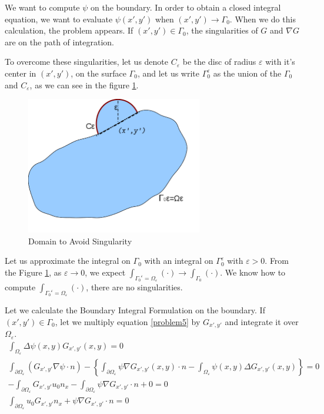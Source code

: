 \documentclass[a4paper,12pt]{article}
\newcommand{\integ}[3]{%
\ensuremath{\displaystyle{\int^{#2}_{#1} #3}}}
\begin{document}
We want to compute $\psi$ on the boundary. In order to obtain a closed integral equation, we want to evaluate $\psi(x',y')$
when $(x',y')\to\Gamma_0$. When we do this calculation, the problem appears. If $(x',y')\in\Gamma_0$, the singularities of $G$ and $\nabla G$ are on the path 
of integration.

To overcome these singularities, let us denote $C_\varepsilon$ be the disc of radius $\varepsilon$ with it's center in $(x',y')$, on the surface $\Gamma_0$, 
and let us write $\Gamma_0^\varepsilon$ as the union of the $\Gamma_0$ and $C_\varepsilon$, as we can see in the figure \ref{obstacleEpsilon}. 
\begin{figure}[!htbp]
\begin{center}
\includegraphics[height = 6cm]{lingkaran2.png}
\end{center}
 \caption{Domain to Avoid Singularity}\label{obstacleEpsilon}
\end{figure}

Let us approximate the integral on $\Gamma_0$ with an integral on $\Gamma_0^\varepsilon$
with $\varepsilon >0$.
From the Figure \ref{obstacleEpsilon}, as $\varepsilon\to0$, we expect $\integ{{\Gamma_0}^\varepsilon=\Omega_\varepsilon}{}{(\cdot)}\to\integ{\Gamma_0}{}{(\cdot)}$.
We know how to compute $\integ{{\Gamma_0}^\varepsilon=\Omega_\varepsilon}{}{(\cdot)}$, there are no singularities.

Let we calculate the Boundary Integral Formulation on the boundary. If $(x',y')\in \Gamma_0$, let we multiply equation
\eqref{problem5} by $G_{x',y'} $ and integrate it over $\Omega_\varepsilon$.
\begin{align}
\integ{\Omega_\varepsilon}{}{ \Delta \psi(x,y) G_{x',y'}(x,y)}=0\\
\integ{\partial\Omega_\varepsilon}{}{(G_{x',y'}\nabla \psi \cdot n) }-
\left\{\integ{\partial\Omega_\varepsilon}{}{\psi \nabla G_{x',y'}(x,y)\cdot n }-
\integ{\Omega_\varepsilon}{}{\psi (x,y)\Delta G_{x',y'}(x,y) }\right\}=0 \\
-\integ{\partial\Omega_\varepsilon}{}{G_{x',y'}u_0 n_x}-\integ{\partial\Omega_\varepsilon}{}{\psi \nabla G_{x',y'}\cdot n}+0=0\\
\integ{\partial\Omega_\varepsilon}{}{u_0 G_{x',y'}n_x+\psi \nabla G_{x',y'}\cdot n} =0 \label{BIboundary}
\end{align}
\end{document}
